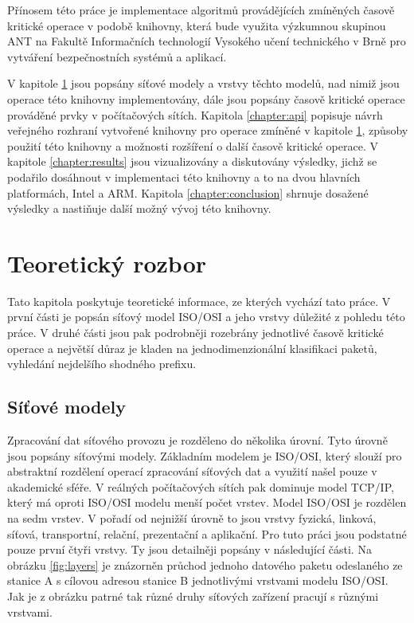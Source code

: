 Přínosem této práce je implementace algoritmů provádějících zmíněných časově kritické operace v podobě knihovny,
která bude využita výzkumnou skupinou ANT na Fakultě Informačních technologií Vysokého učení technického v Brně
pro vytváření bezpečnostních systémů a aplikací.

V kapitole \ref{chapter:theoretical} jsou popsány síťové modely a vrstvy těchto modelů,
nad nimiž jsou operace této knihovny implementovány, dále jsou popsány časově kritické operace prováděné
prvky v počítačových sítích. Kapitola \ref{chapter:api} popisuje návrh veřejného rozhraní vytvořené knihovny
pro operace zmíněné v kapitole \ref{chapter:theoretical}, způsoby použití této knihovny a možnosti rozšíření
o další časově kritické operace. V kapitole \ref{chapter:results} jsou vizualizovány a diskutovány
výsledky, jichž se podařilo dosáhnout v implementaci této knihovny a to na dvou hlavních platformách, Intel a ARM.
Kapitola \ref{chapter:conclusion} shrnuje dosažené výsledky a nastiňuje další možný vývoj této knihovny.

\chapter{Teoretický rozbor}\label{chapter:theoretical} %

Tato kapitola poskytuje teoretické informace, ze kterých vychází tato práce.
V první části je popsán síťový model ISO/OSI a jeho vrstvy důležité z pohledu této práce.
V druhé části jsou pak podrobněji rozebrány jednotlivé časově kritické operace a největší důraz je
kladen na jednodimenzionální klasifikaci paketů, vyhledání nejdelšího shodného prefixu.


\section{Síťové modely}\label{section:models} %
Zpracování dat síťového provozu je rozděleno do několika úrovní. Tyto úrovně jsou popsány síťovými modely.
Základním modelem je ISO/OSI, který slouží pro abstraktní rozdělení operací zpracování síťových dat a využití
našel pouze v akademické sféře. V reálných počítačových sítích pak dominuje model TCP/IP, který má oproti
ISO/OSI modelu menší počet vrstev. Model ISO/OSI je rozdělen na sedm vrstev. V pořadí od nejnižší úrovně to
jsou vrstvy fyzická, linková, síťová, transportní, relační, prezentační a aplikační. Pro tuto práci jsou
podstatné pouze první čtyři vrstvy. Ty jsou detailněji popsány v následující části. Na obrázku \ref{fig:layers} je
znázorněn průchod jednoho datového paketu odeslaného ze stanice A s cílovou adresou stanice B jednotlivými vrstvami modelu ISO/OSI. Jak je z obrázku patrné tak různé druhy síťových zařízení pracují s různými vrstvami.

